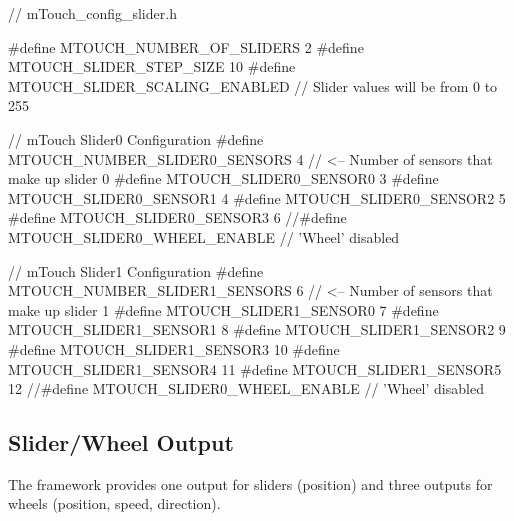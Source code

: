 \begin{DoxyCode}
\textcolor{comment}{// mTouch\_config\_slider.h}

\textcolor{preprocessor}{#define MTOUCH\_NUMBER\_OF\_SLIDERS        2   }
\textcolor{preprocessor}{#define MTOUCH\_SLIDER\_STEP\_SIZE         10        }
\textcolor{preprocessor}{#define MTOUCH\_SLIDER\_SCALING\_ENABLED       // Slider values will be from 0 to 255}

\textcolor{comment}{// mTouch Slider0 Configuration }
\textcolor{preprocessor}{#define MTOUCH\_NUMBER\_SLIDER0\_SENSORS   4   // <-- Number of sensors that make up slider 0}
\textcolor{preprocessor}{#define MTOUCH\_SLIDER0\_SENSOR0          3   }
\textcolor{preprocessor}{#define MTOUCH\_SLIDER0\_SENSOR1          4   }
\textcolor{preprocessor}{#define MTOUCH\_SLIDER0\_SENSOR2          5  }
\textcolor{preprocessor}{#define MTOUCH\_SLIDER0\_SENSOR3          6   }
\textcolor{comment}{//#define MTOUCH\_SLIDER0\_WHEEL\_ENABLE       // 'Wheel' disabled}
   
\textcolor{comment}{// mTouch Slider1 Configuration }
\textcolor{preprocessor}{#define MTOUCH\_NUMBER\_SLIDER1\_SENSORS   6   // <-- Number of sensors that make up slider 1}
\textcolor{preprocessor}{#define MTOUCH\_SLIDER1\_SENSOR0          7   }
\textcolor{preprocessor}{#define MTOUCH\_SLIDER1\_SENSOR1          8       }
\textcolor{preprocessor}{#define MTOUCH\_SLIDER1\_SENSOR2          9   }
\textcolor{preprocessor}{#define MTOUCH\_SLIDER1\_SENSOR3          10       }
\textcolor{preprocessor}{#define MTOUCH\_SLIDER1\_SENSOR4          11  }
\textcolor{preprocessor}{#define MTOUCH\_SLIDER1\_SENSOR5          12       }
\textcolor{preprocessor}{//#define MTOUCH\_SLIDER0\_WHEEL\_ENABLE       // 'Wheel' disabled}
\end{DoxyCode}
\hypertarget{feat_sliders_featSlider-Out}{}\subsection{Slider/\+Wheel Output}\label{feat_sliders_featSlider-Out}
The framework provides one output for sliders (position) and three outputs for wheels (position, speed, direction). 
